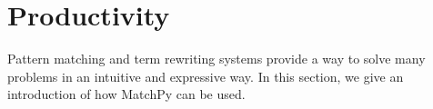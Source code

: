 \documentclass[conference,compsoc]{IEEEtran}
\begin{document}


\section{Productivity}

Pattern matching and term rewriting systems provide a way to solve many problems in an intuitive and expressive way.
In this section, we give an introduction of how MatchPy can be used.
\end{document}

